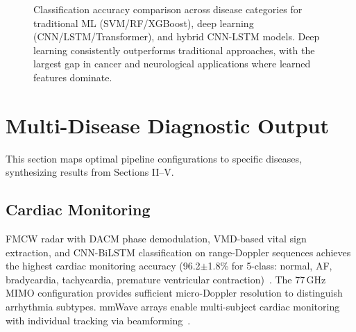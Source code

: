 \documentclass[journal,twoside]{IEEEtran}
\begin{document}
\begin{figure}[!t]
\centering
{}
\caption{Classification accuracy comparison across disease categories for traditional ML (SVM/RF/XGBoost), deep learning (CNN/LSTM/Transformer), and hybrid CNN-LSTM models. Deep learning consistently outperforms traditional approaches, with the largest gap in cancer and neurological applications where learned features dominate.}
\label{fig:accuracy_comparison}
\end{figure}


\section{Multi-Disease Diagnostic Output}

This section maps optimal pipeline configurations to specific diseases, synthesizing results from Sections II--V.

\subsection{Cardiac Monitoring}
FMCW radar with DACM phase demodulation, VMD-based vital sign extraction, and CNN-BiLSTM classification on range-Doppler sequences achieves the highest cardiac monitoring accuracy (96.2$\pm$1.8\% for 5-class: normal, AF, bradycardia, tachycardia, premature ventricular contraction)~\cite{ref_multiscenario_mimo2025}. The 77\,GHz MIMO configuration provides sufficient micro-Doppler resolution to distinguish arrhythmia subtypes. mmWave arrays enable multi-subject cardiac monitoring with individual tracking via beamforming~\cite{ref_multipoint_mimo2024}.
\end{document}
